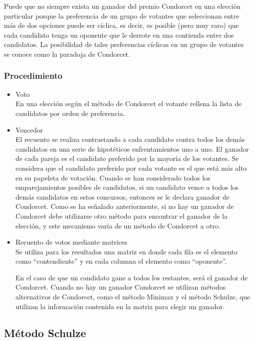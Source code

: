 \documentclass[12pt,a4paper,]{book}
\numberwithin{dummy}{section}
\theoremstyle{ocrenumbox}
\theoremstyle{blacknumex}
\theoremstyle{blacknumbox}
\theoremstyle{ocrenum}
\theoremstyle{ocrenum}
\begin{document}
Puede que no siempre exista un ganador del premio Condorcet en una
elección particular porque la preferencia de un grupo de votantes que
seleccionan entre más de dos opciones puede ser cíclica, es decir, es
posible (pero muy raro) que cada candidato tenga un oponente que le
derrote en una contienda entre dos candidatos. La posibilidad de tales
preferencias cíclicas en un grupo de votantes se conoce como la paradoja
de Condorcet.

\hypertarget{procedimiento}{%
\subsubsection{Procedimiento}\label{procedimiento}}

\begin{itemize}
\item
  Voto\\
  En una elección según el método de Condorcet el votante rellena la
  lista de candidatos por orden de preferencia.
\item
  Vencedor\\
  El recuento se realiza contrastando a cada candidato contra todos los
  demás candidatos en una serie de hipotéticos enfrentamientos uno a
  uno. El ganador de cada pareja es el candidato preferido por la
  mayoría de los votantes. Se considera que el candidato preferido por
  cada votante es el que está más alto en su papeleta de votación.
  Cuando se han considerado todos los emparejamientos posibles de
  candidatos, si un candidato vence a todos los demás candidatos en
  estos concursos, entonces se le declara ganador de Condorcet. Como se
  ha señalado anteriormente, si no hay un ganador de Condorcet debe
  utilizarse otro método para encontrar el ganador de la elección, y
  este mecanismo varía de un método de Condorcet a otro.
\item
  Recuento de votos mediante matrices\\
  Se utiliza para los resultados una matriz en donde cada fila es el
  elemento como ``contendiente'' y en cada columna el elemento como
  ``oponente''.

  En el caso de que un candidato gane a todos los restantes, será el
  ganador de Condorcet. Cuando no hay un ganador Condorcet se utilizan
  métodos alternativos de Condorcet, como el método Minimax y el método
  Schulze, que utilizan la información contenida en la matriz para
  elegir un ganador.
\end{itemize}

\hypertarget{muxe9todo-schulze}{%
\subsection{Método Schulze}\label{muxe9todo-schulze}}
\end{document}
